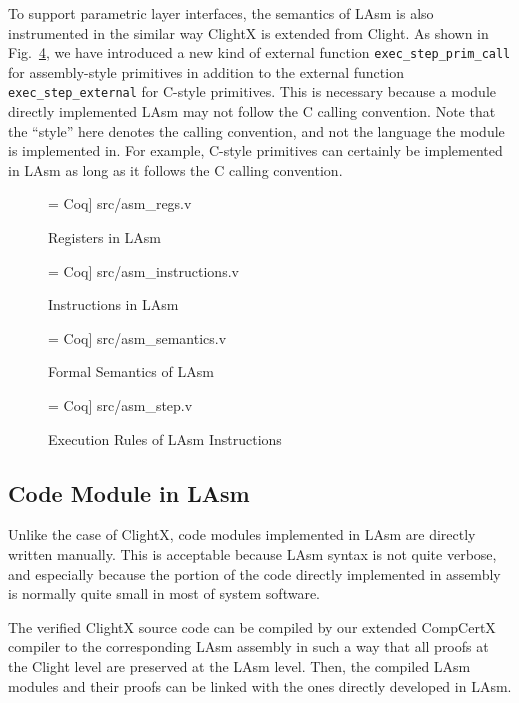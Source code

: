 To support parametric layer interfaces, the semantics of LAsm is also instrumented
in the similar way ClightX is extended from Clight.
As shown in Fig.~\ref{fig:lasm_step}, we have introduced a new kind of
external function \texttt{exec\_step\_prim\_call} for assembly-style primitives
in addition to the external function \texttt{exec\_step\_external} for C-style primitives.
This is necessary because a module directly implemented LAsm may not follow the C
calling convention. Note that the ``style'' here denotes the calling convention,
and not the language the module is implemented in. For example, C-style
primitives can certainly be implemented in LAsm as long as it follows the C calling
convention.


\begin{figure}
 = Coq] {src/asm_regs.v}
\caption{Registers in LAsm}
\label{fig:lasm_regs}
\end{figure}

\begin{figure}
 = Coq] {src/asm_instructions.v}
\caption{Instructions in LAsm}
\label{fig:lasm_instructions}
\end{figure}

\begin{figure}
 = Coq] {src/asm_semantics.v}
\caption{Formal Semantics of LAsm}
\label{fig:lasm_semantics}
\end{figure}

\begin{figure}
 = Coq] {src/asm_step.v}
\caption{Execution Rules of LAsm Instructions}
\label{fig:lasm_step}
\end{figure}


\subsection{Code Module in LAsm}

Unlike the case of ClightX, code modules implemented in LAsm are
directly written manually. This is acceptable because LAsm syntax
is not quite verbose, and especially because the portion of the code
directly implemented in assembly is normally quite small in most
of system software.

The verified ClightX
source code can be compiled by our extended CompCertX compiler
\cite{dscal15} to the corresponding LAsm assembly in such a way that
all proofs at the Clight level are preserved at the LAsm level. Then,
the compiled LAsm modules and their proofs can be linked with the ones
directly developed in LAsm.


